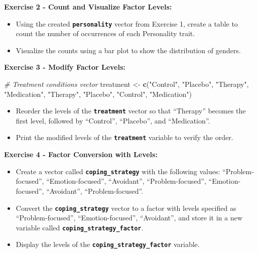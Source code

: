 \documentclass[
]{book}
\newenvironment{Shaded}{\begin{snugshade}}{\end{snugshade}}
\newcommand{\CommentTok}[1]{\textcolor[rgb]{0.56,0.35,0.01}{\textit{#1}}}
\newcommand{\FunctionTok}[1]{\textcolor[rgb]{0.13,0.29,0.53}{\textbf{#1}}}
\newcommand{\NormalTok}[1]{#1}
\newcommand{\OtherTok}[1]{\textcolor[rgb]{0.56,0.35,0.01}{#1}}
\newcommand{\StringTok}[1]{\textcolor[rgb]{0.31,0.60,0.02}{#1}}
\begin{document}
\textbf{Exercise 2 - Count and Visualize Factor Levels:}

\begin{itemize}
\item
  Using the created \textbf{\texttt{personality}} vector from Exercise 1, create a table to count the number of occurrences of each Personality trait.
\item
  Visualize the counts using a bar plot to show the distribution of genders.
\end{itemize}

\textbf{Exercise 3 - Modify Factor Levels:}

\begin{Shaded}
\begin{Highlighting}[]
\CommentTok{\# Treatment conditions vector}
\NormalTok{treatment }\OtherTok{\textless{}{-}} \FunctionTok{c}\NormalTok{(}\StringTok{"Control"}\NormalTok{, }\StringTok{"Placebo"}\NormalTok{, }\StringTok{"Therapy"}\NormalTok{, }\StringTok{"Medication"}\NormalTok{, }\StringTok{"Therapy"}\NormalTok{, }\StringTok{"Placebo"}\NormalTok{, }\StringTok{"Control"}\NormalTok{, }\StringTok{"Medication"}\NormalTok{)}
\end{Highlighting}
\end{Shaded}

\begin{itemize}
\item
  Reorder the levels of the \textbf{\texttt{treatment}} vector so that ``Therapy'' becomes the first level, followed by ``Control'', ``Placebo'', and ``Medication''.
\item
  Print the modified levels of the \textbf{\texttt{treatment}} variable to verify the order.
\end{itemize}

\textbf{Exercise 4 - Factor Conversion with Levels:}

\begin{itemize}
\item
  Create a vector called \textbf{\texttt{coping\_strategy}} with the following values: ``Problem-focused'', ``Emotion-focused'', ``Avoidant'', ``Problem-focused'', ``Emotion-focused'', ``Avoidant'', ``Problem-focused''.
\item
  Convert the \textbf{\texttt{coping\_strategy}} vector to a factor with levels specified as ``Problem-focused'', ``Emotion-focused'', ``Avoidant'', and store it in a new variable called \textbf{\texttt{coping\_strategy\_factor}}.
\item
  Display the levels of the \textbf{\texttt{coping\_strategy\_factor}} variable.
\end{itemize}
\end{document}
